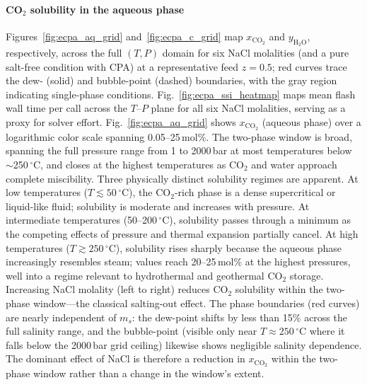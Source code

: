 \documentclass[preprint,12pt,authoryear]{elsarticle}
\begin{document}
\paragraph{CO$_2$ solubility in the aqueous phase}
Figures~\ref{fig:ecpa_aq_grid} and~\ref{fig:ecpa_c_grid} map $x_{\text{CO}_2}$ and
$y_{\text{H}_2\text{O}}$, respectively, across the full $(T, P)$ domain for six NaCl molalities (and a pure salt-free condition with CPA)
at a representative feed $z = 0.5$; red curves trace the dew- (solid) and bubble-point (dashed) boundaries,
with the gray region indicating single-phase conditions.
Fig.~\ref{fig:ecpa_ssi_heatmap} maps mean flash wall time per call
across the $T$--$P$ plane for all six NaCl molalities, serving as a proxy for
solver effort.
Fig.~\ref{fig:ecpa_aq_grid} shows $x_{\text{CO}_2}$ (aqueous phase) over a
logarithmic color scale spanning 0.05--25\,mol\%.
The two-phase window is broad, spanning the full pressure range from 1 to
2000\,bar at most temperatures below $\sim$250\,$^\circ$C, and closes at the highest
temperatures as CO$_2$ and water approach complete miscibility.
Three physically distinct solubility regimes are apparent.
At low temperatures ($T \lesssim 50\,^\circ$C), the CO$_2$-rich phase is a dense
supercritical or liquid-like fluid; solubility is moderate and increases with pressure.
At intermediate temperatures (50--200\,$^\circ$C), solubility passes through a minimum
as the competing effects of pressure and thermal expansion partially cancel.
At high temperatures ($T \gtrsim 250\,^\circ$C), solubility rises sharply because the
aqueous phase increasingly resembles steam; values reach 20--25\,mol\% at the highest
pressures, well into a regime relevant to hydrothermal and geothermal CO$_2$ storage.
Increasing NaCl molality (left to right) reduces CO$_2$ solubility within the
two-phase window---the classical salting-out effect.
The phase boundaries (red curves) are nearly independent of $m_s$: the dew-point
shifts by less than 15\% across the full salinity range,
and the bubble-point (visible only near $T \approx 250\,^\circ$C where it falls below
the 2000\,bar grid ceiling) likewise shows negligible salinity dependence.
The dominant effect of NaCl is therefore a reduction in $x_{\text{CO}_2}$ within the
two-phase window rather than a change in the window's extent.
\end{document}
